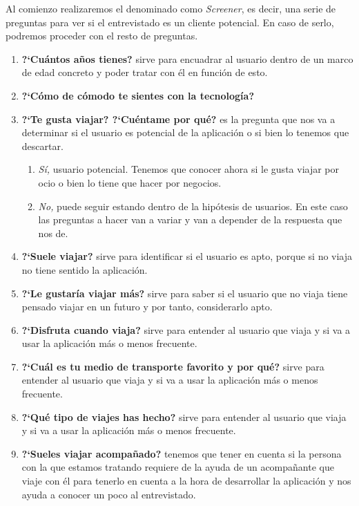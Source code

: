 Al comienzo realizaremos el denominado como \textit{Screener}, es decir, una serie de preguntas para ver si el entrevistado es un cliente potencial. En caso de serlo,
podremos proceder con el resto de preguntas.

\begin{enumerate}
    \item {\textbf{?`Cuántos años tienes?}} sirve para encuadrar al usuario dentro de un marco de edad concreto y poder tratar con él en función de esto.
    \item {\textbf{?`Cómo de cómodo te sientes con la tecnología?}}
    \item {\textbf{?`Te gusta viajar? ?`Cuéntame por qué?}} es la pregunta que nos va a determinar si el usuario es potencial de la aplicación
                o si bien lo tenemos que descartar.
    \begin{enumerate}
        \item {\textit{Sí,}} usuario potencial. Tenemos que conocer ahora si le gusta viajar por ocio o bien lo tiene que hacer por negocios.
        \item {\textit{No,}} puede seguir estando dentro de la hipótesis de usuarios. En este caso las preguntas a hacer van a variar y van a
                        depender de la respuesta que nos de.
    \end{enumerate}
    \item {\textbf{?`Suele viajar?}} sirve para identificar si el usuario es apto, porque si no viaja no tiene sentido la aplicación.
    \item {\textbf{?`Le gustaría viajar más?}} sirve para saber si el usuario que no viaja tiene pensado viajar en un futuro y por tanto, considerarlo apto.
    \item {\textbf{?`Disfruta cuando viaja?}} sirve para entender al usuario que viaja y si va a usar la aplicación más o menos frecuente.
    \item {\textbf{?`Cuál es tu medio de transporte favorito y por qué?}} sirve para entender al usuario que viaja y si va a usar la aplicación más o menos frecuente.
    \item {\textbf{?`Qué tipo de viajes has hecho?}} sirve para entender al usuario que viaja y si va a usar la aplicación más o menos frecuente.
    \item {\textbf{?`Sueles viajar acompañado?}} tenemos que tener en cuenta si la persona con la que estamos tratando requiere de la
                ayuda de un acompañante que viaje con él para tenerlo en cuenta a la hora de desarrollar la aplicación y nos ayuda a conocer un poco al entrevistado.

\end{enumerate}
